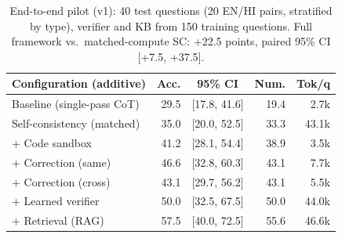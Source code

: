 \begin{table}[t]
\centering
\footnotesize
\caption{End-to-end pilot (v1): 40 test questions (20 EN/HI pairs, stratified by type), verifier and KB from 150 training questions. Full framework vs.\ matched-compute SC: +22.5 points, paired 95\% CI [+7.5, +37.5].}
\label{tab:pilot}
\setlength{\tabcolsep}{3.5pt}
\begin{tabular}{lrcrr}
\toprule
Configuration (additive) & Acc. & 95\% CI & Num. & Tok/q \\
\midrule
Baseline (single-pass CoT) & 29.5 & [17.8, 41.6] & 19.4 & 2.7k \\
Self-consistency (matched) & 35.0 & [20.0, 52.5] & 33.3 & 43.1k \\
+ Code sandbox & 41.2 & [28.1, 54.4] & 38.9 & 3.5k \\
+ Correction (same) & 46.6 & [32.8, 60.3] & 43.1 & 7.7k \\
+ Correction (cross) & 43.1 & [29.7, 56.2] & 43.1 & 5.5k \\
+ Learned verifier & 50.0 & [32.5, 67.5] & 50.0 & 44.0k \\
+ Retrieval (RAG) & 57.5 & [40.0, 72.5] & 55.6 & 46.6k \\
\bottomrule
\end{tabular}
\end{table}
